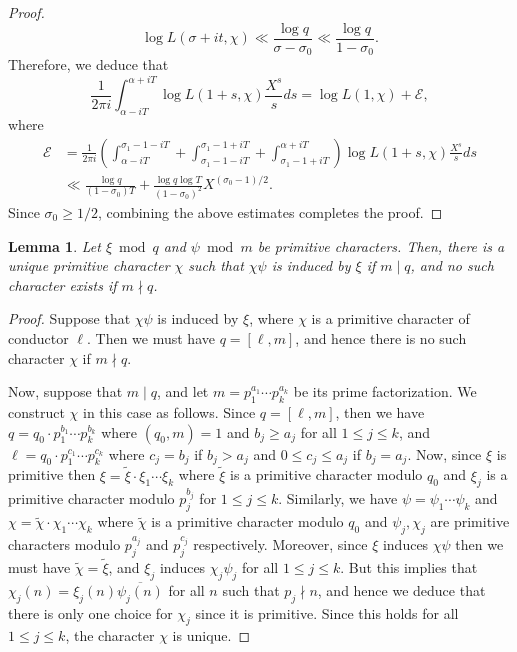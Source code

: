 \documentclass[12pt]{amsart}
\newtheorem{lem}[thm]{Lemma}
\theoremstyle{definition}
\numberwithin{equation}{section}
\renewcommand{\bar}{\overline}
\begin{document}
\begin{proof}
$$\log L(\sigma+it, \chi)\ll \frac{\log q}{\sigma-\sigma_0}\ll\frac{\log q}{1-\sigma_0} .$$Therefore, we deduce that
$$ \frac{1}{2\pi i} \int_{\alpha-iT}^{\alpha+iT} \log L(1+s, \chi) \frac{X^s}{s} ds= \log L(1, \chi)+\mathcal{E}, $$
where 
\begin{align*}
\mathcal{E}&= \frac{1}{2\pi i} \left(\int_{\alpha-iT}^{\sigma_1-1-iT}+\int_{\sigma_1-1-iT}^{\sigma_1-1+iT}+ \int_{\sigma_1-1+iT}^{\alpha+iT}\right)\log L(1+s, \chi) \frac{X^s}{s} ds\\
&\ll \frac{\log q}{(1-\sigma_0)T}+ \frac{\log q \log T}{(1-\sigma_0)^2} X^{(\sigma_0-1)/2}.
\end{align*}
Since $\sigma_0 \geq 1/2$, combining the above estimates completes the proof.
\end{proof}
\begin{lem}\label{InducedFixed}
Let $\xi\bmod q$ and $\psi \bmod m$ be primitive characters. Then, there is a unique primitive character $\chi$ such that $\chi\psi$ is induced by $\xi$ if $m \mid q$, and no such character exists if $m\nmid q$.
\end{lem}

\begin{proof}
Suppose that $\chi \psi$ is induced by $\xi$, where $\chi$ is a primitive character of conductor $\ell$. Then we must have $q=[\ell, m]$, and hence 
there is no such character $\chi$ if $m\nmid q$. 

Now, suppose that $m\mid q$, and let $m=p_1^{a_1}\cdots p_k^{a_k}$ be its prime factorization. We construct $\chi$ in this case as follows. Since $q=[\ell, m]$, then we have 
$q=q_0\cdot p_1^{b_1}\cdots p_k^{b_k}$ where $(q_0, m)=1$ and $b_j\geq a_j$ for all $1\leq j\leq k$, and $\ell=q_0\cdot p_1^{c_1}\cdots p_k^{c_k}$ where $c_j=b_j$ if $b_j>a_j$ and $0\leq c_j\leq a_j$ if $b_j=a_j$. 
Now, since $\xi$ is primitive then $\xi= \tilde{\xi}\cdot\xi_1\cdots\xi_k$ where $\tilde{\xi}$ is a primitive character modulo $q_0$ and $\xi_j$ is a primitive character modulo $p_j^{b_j}$ for $1\leq j\leq k$. Similarly, we have $\psi=\psi_1\cdots\psi_k$ and $\chi=\tilde{\chi}\cdot \chi_1\cdots\chi_k$ where $\tilde{\chi}$ is a primitive character modulo $q_0$ and $\psi_j, \chi_j$ are primitive characters modulo $p_j^{a_j}$ and $p_j^{c_j}$ respectively. Moreover, since $\xi$ induces $\chi\psi$ then we must have $\tilde{\chi}=\tilde{\xi}$, and $\xi_j$ induces $\chi_j\psi_j$ for all $1\leq j\leq k$. But this implies that $\chi_j(n)=\xi_j(n)\bar{\psi_j(n)}$ for all $n$ such that $p_j\nmid n$, and hence we deduce that there is only one choice for $\chi_j$ since it is  primitive. Since this holds for all $1\leq j\leq k$, the character $\chi$ is unique.
\end{proof}
\end{document}
